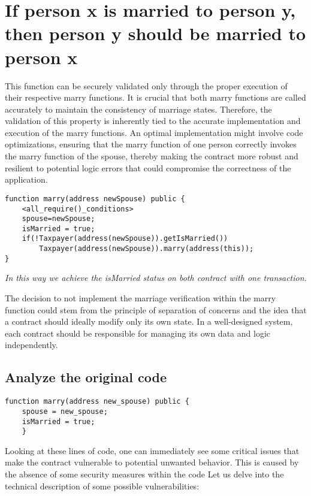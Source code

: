 \documentclass{article}
\begin{document}
\section{If person x is married to person y, then person y should be married to person x}
This function can be securely validated only through the proper execution of their respective marry functions. It is crucial that both marry functions are called accurately to maintain the consistency of marriage states. Therefore, the validation of this property is inherently tied to the accurate implementation and execution of the marry functions. An optimal implementation might involve code optimizations, ensuring that the marry function of one person correctly invokes the marry function of the spouse, thereby making the contract more robust and resilient to potential logic errors that could compromise the correctness of the application. 
\begin{verbatim}
function marry(address newSpouse) public {
    <all_require()_conditions>
    spouse=newSpouse;
    isMarried = true;
    if(!Taxpayer(address(newSpouse)).getIsMarried())
        Taxpayer(address(newSpouse)).marry(address(this));
}
\end{verbatim}

\textit{In this way we achieve the isMarried status on both contract with one transaction.}

The decision to not implement the marriage verification within the marry function could stem from the principle of separation of concerns and the idea that a contract should ideally modify only its own state. In a well-designed system, each contract should be responsible for managing its own data and logic independently.



\break
\subsection{Analyze the original code}
\label{sec:original_marry}
\begin{verbatim}
function marry(address new_spouse) public {
    spouse = new_spouse;
    isMarried = true;
    }
\end{verbatim}
Looking at these lines of code, one can immediately see some critical issues that make the contract vulnerable to potential unwanted behavior. This is caused by the absence of some security measures within the code Let us delve into the technical description of some possible vulnerabilities:
 
\end{document}
